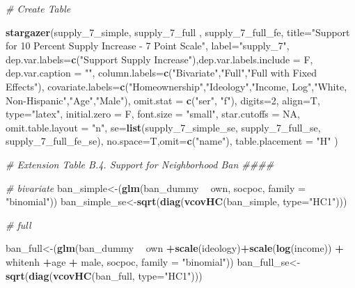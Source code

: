 \documentclass[]{article}
\newenvironment{Shaded}{\begin{snugshade}}{\end{snugshade}}
\newcommand{\CommentTok}[1]{\textcolor[rgb]{0.56,0.35,0.01}{\textit{#1}}}
\newcommand{\DataTypeTok}[1]{\textcolor[rgb]{0.13,0.29,0.53}{#1}}
\newcommand{\DecValTok}[1]{\textcolor[rgb]{0.00,0.00,0.81}{#1}}
\newcommand{\KeywordTok}[1]{\textcolor[rgb]{0.13,0.29,0.53}{\textbf{#1}}}
\newcommand{\NormalTok}[1]{#1}
\newcommand{\OperatorTok}[1]{\textcolor[rgb]{0.81,0.36,0.00}{\textbf{#1}}}
\newcommand{\OtherTok}[1]{\textcolor[rgb]{0.56,0.35,0.01}{#1}}
\newcommand{\StringTok}[1]{\textcolor[rgb]{0.31,0.60,0.02}{#1}}
\begin{document}
\begin{Shaded}
\begin{Highlighting}[]
{\CommentTok{# Create Table}

\KeywordTok{stargazer}\NormalTok{(supply_}\DecValTok{7}\NormalTok{_simple,  supply_}\DecValTok{7}\NormalTok{_full , supply_}\DecValTok{7}\NormalTok{_full_fe, }\DataTypeTok{title=}\StringTok{"Support for 10 Percent Supply Increase - 7 Point Scale"}\NormalTok{, }\DataTypeTok{label=}\StringTok{"supply_7"}\NormalTok{,}
          \DataTypeTok{dep.var.labels=}\KeywordTok{c}\NormalTok{(}\StringTok{"Support Supply Increase"}\NormalTok{),}\DataTypeTok{dep.var.labels.include =}\NormalTok{ F, }\DataTypeTok{dep.var.caption =} \StringTok{""}\NormalTok{,}
          \DataTypeTok{column.labels=}\KeywordTok{c}\NormalTok{(}\StringTok{"Bivariate"}\NormalTok{,}\StringTok{"Full"}\NormalTok{,}\StringTok{"Full with Fixed Effects"}\NormalTok{),}
          \DataTypeTok{covariate.labels=}\KeywordTok{c}\NormalTok{(}\StringTok{"Homeownership"}\NormalTok{,}\StringTok{"Ideology"}\NormalTok{,}\StringTok{"Income, Log"}\NormalTok{,}\StringTok{"White, Non-Hispanic"}\NormalTok{,}\StringTok{"Age"}\NormalTok{,}\StringTok{"Male"}\NormalTok{),}
          \DataTypeTok{omit.stat =} \KeywordTok{c}\NormalTok{(}\StringTok{"ser"}\NormalTok{, }\StringTok{"f"}\NormalTok{), }\DataTypeTok{digits=}\DecValTok{2}\NormalTok{, }\DataTypeTok{align=}\NormalTok{T, }\DataTypeTok{type=}\StringTok{"latex"}\NormalTok{,}
          \DataTypeTok{initial.zero =}\NormalTok{ F,  }\DataTypeTok{font.size =} \StringTok{"small"}\NormalTok{, }\DataTypeTok{star.cutoffs =} \OtherTok{NA}\NormalTok{, }\DataTypeTok{omit.table.layout =} \StringTok{"n"}\NormalTok{,}
          \DataTypeTok{se=}\KeywordTok{list}\NormalTok{(supply_}\DecValTok{7}\NormalTok{_simple_se, supply_}\DecValTok{7}\NormalTok{_full_se, supply_}\DecValTok{7}\NormalTok{_full_fe_se), }\DataTypeTok{no.space=}\NormalTok{T,}\DataTypeTok{omit=}\KeywordTok{c}\NormalTok{(}\StringTok{"name"}\NormalTok{), }\DataTypeTok{table.placement =} \StringTok{"H"}\NormalTok{ )}


\CommentTok{# Extension Table B.4. Support for Neighborhood Ban ####}

\CommentTok{# bivariate}
\NormalTok{ban_simple<-(}\KeywordTok{glm}\NormalTok{(ban_dummy }\OperatorTok{~}\StringTok{ }\NormalTok{own, socpoc, }\DataTypeTok{family =} \StringTok{"binomial"}\NormalTok{))}
\NormalTok{ban_simple_se<-}\KeywordTok{sqrt}\NormalTok{(}\KeywordTok{diag}\NormalTok{(}\KeywordTok{vcovHC}\NormalTok{(ban_simple, }\DataTypeTok{type=}\StringTok{"HC1"}\NormalTok{)))}

\CommentTok{# full}

\NormalTok{ban_full<-(}\KeywordTok{glm}\NormalTok{(ban_dummy }\OperatorTok{~}\StringTok{ }\NormalTok{own }\OperatorTok{+}\KeywordTok{scale}\NormalTok{(ideology)}\OperatorTok{+}\KeywordTok{scale}\NormalTok{(}\KeywordTok{log}\NormalTok{(income)) }\OperatorTok{+}\StringTok{ }\NormalTok{whitenh  }\OperatorTok{+}\NormalTok{age }\OperatorTok{+}\StringTok{ }\NormalTok{male, socpoc, }\DataTypeTok{family =} \StringTok{"binomial"}\NormalTok{))}
\NormalTok{ban_full_se<-}\KeywordTok{sqrt}\NormalTok{(}\KeywordTok{diag}\NormalTok{(}\KeywordTok{vcovHC}\NormalTok{(ban_full, }\DataTypeTok{type=}\StringTok{"HC1"}\NormalTok{)))}

}
\end{Highlighting}
\end{Shaded}
\end{document}
